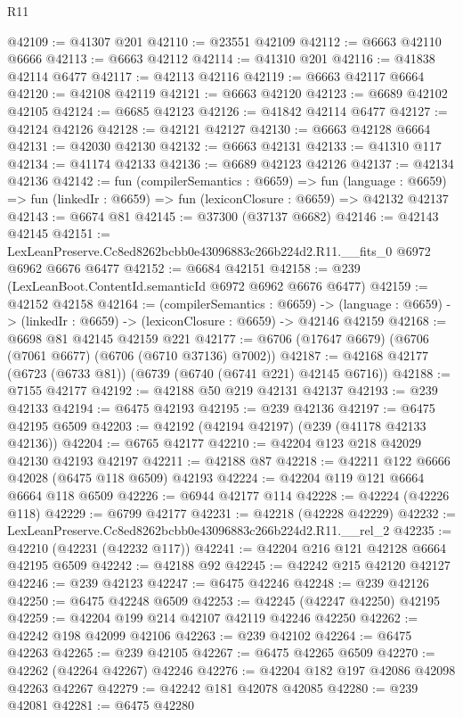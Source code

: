\begin{lexlean}{R11}
\begin{coremodule}
@42109 := @41307 @201
@42110 := @23551 @42109
@42112 := @6663 @42110 @6666
@42113 := @6663 @42112
@42114 := @41310 @201
@42116 := @41838 @42114 @6477
@42117 := @42113 @42116
@42119 := @6663 @42117 @6664
@42120 := @42108 @42119
@42121 := @6663 @42120
@42123 := @6689 @42102 @42105
@42124 := @6685 @42123
@42126 := @41842 @42114 @6477
@42127 := @42124 @42126
@42128 := @42121 @42127
@42130 := @6663 @42128 @6664
@42131 := @42030 @42130
@42132 := @6663 @42131
@42133 := @41310 @117
@42134 := @41174 @42133
@42136 := @6689 @42123 @42126
@42137 := @42134 @42136
@42142 := fun (compilerSemantics : @6659) =>
  fun (language : @6659) => fun (linkedIr : @6659) => fun (lexiconClosure : @6659) => @42132 @42137
@42143 := @6674 @81
@42145 := @37300 (@37137 @6682)
@42146 := @42143 @42145
@42151 := LexLeanPreserve.Cc8ed8262bcbb0e43096883c266b224d2.R11.__fits_0 @6972 @6962 @6676 @6477
@42152 := @6684 @42151
@42158 := @239 (LexLeanBoot.ContentId.semanticId @6972 @6962 @6676 @6477)
@42159 := @42152 @42158
@42164 := (compilerSemantics : @6659) ->
  (language : @6659) -> (linkedIr : @6659) -> (lexiconClosure : @6659) -> @42146 @42159
@42168 := @6698 @81 @42145 @42159 @221
@42177 := @6706 (@17647 @6679) (@6706 (@7061 @6677) (@6706 (@6710 @37136) @7002))
@42187 := @42168 @42177 (@6723 (@6733 @81)) (@6739 (@6740 (@6741 @221) @42145 @6716))
@42188 := @7155 @42177
@42192 := @42188 @50 @219 @42131 @42137
@42193 := @239 @42133
@42194 := @6475 @42193
@42195 := @239 @42136
@42197 := @6475 @42195 @6509
@42203 := @42192 (@42194 @42197) (@239 (@41178 @42133 @42136))
@42204 := @6765 @42177
@42210 := @42204 @123 @218 @42029 @42130 @42193 @42197
@42211 := @42188 @87
@42218 := @42211 @122 @6666 @42028 (@6475 @118 @6509) @42193
@42224 := @42204 @119 @121 @6664 @6664 @118 @6509
@42226 := @6944 @42177 @114
@42228 := @42224 (@42226 @118)
@42229 := @6799 @42177
@42231 := @42218 (@42228 @42229)
@42232 := LexLeanPreserve.Cc8ed8262bcbb0e43096883c266b224d2.R11.__rel_2
@42235 := @42210 (@42231 (@42232 @117))
@42241 := @42204 @216 @121 @42128 @6664 @42195 @6509
@42242 := @42188 @92
@42245 := @42242 @215 @42120 @42127
@42246 := @239 @42123
@42247 := @6475 @42246
@42248 := @239 @42126
@42250 := @6475 @42248 @6509
@42253 := @42245 (@42247 @42250) @42195
@42259 := @42204 @199 @214 @42107 @42119 @42246 @42250
@42262 := @42242 @198 @42099 @42106
@42263 := @239 @42102
@42264 := @6475 @42263
@42265 := @239 @42105
@42267 := @6475 @42265 @6509
@42270 := @42262 (@42264 @42267) @42246
@42276 := @42204 @182 @197 @42086 @42098 @42263 @42267
@42279 := @42242 @181 @42078 @42085
@42280 := @239 @42081
@42281 := @6475 @42280

\end{coremodule}
\end{lexlean}
